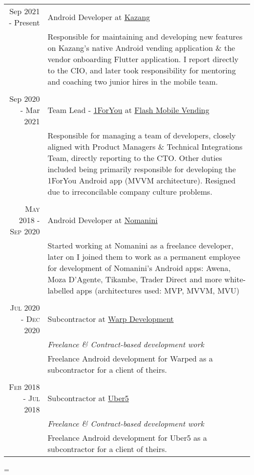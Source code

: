 \documentclass[a4paper,10pt,notitlepage]{article}
\newenvironment{absolutelynopagebreak}
  {\par\nobreak\vfil\penalty0\vfilneg
   \vtop\bgroup}
  {\par\xdef\tpd{\the\prevdepth}\egroup
   \prevdepth=\tpd}
\begin{document}
\begin{absolutelynopagebreak}
\begin{tabular}{r|p{11cm}}
	\textsc Sep 2021 - Present}  & Android Developer at \href{www.kazang.com}{Kazang}
		\\&\footnotesize{Responsible for maintaining and developing new features on Kazang's native Android vending application \& the vendor onboarding Flutter application. I report directly to the CIO, and later took responsibility for mentoring and coaching two junior hires in the mobile team.}\\
		
		\multicolumn{2}{c}{} \\
	
	\textsc Sep 2020 - Mar 2021}  & Team Lead - \href{www.1foryou.com}{1ForYou} at \href{www.flash.co.za}{Flash Mobile Vending}
		\\&\footnotesize{Responsible for managing a team of developers, closely aligned with Product Managers \& Technical Integrations Team, directly reporting to the CTO. Other duties included being primarily responsible for developing the 1ForYou Android app (MVVM architecture). Resigned due to irreconcilable company culture problems.}\\
		
		\multicolumn{2}{c}{} \\
	
	    \textsc{May 2018 - Sep 2020}  & Android Developer at \href{www.nomanini.com}{Nomanini}
		\\&\footnotesize{Started working at Nomanini as a freelance developer, later on I joined them to work as a permanent employee for development of Nomanini's Android apps: Awena, Moza D'Agente, Tikambe, Trader Direct and more white-labelled apps (architectures used: MVP, MVVM, MVU)}\\
		
		\multicolumn{2}{c}{} \\
		
		\textsc{Jul 2020 - Dec 2020}  & Subcontractor at \href{www.warpdevelopment.com}{Warp Development}
		\\&\emph{Freelance \& Contract-based development work}\\&\footnotesize{Freelance Android development for Warped as a subcontractor for a client of theirs.}\\
		
		\multicolumn{2}{c}{} \\
	
    	\textsc{Feb 2018 - Jul 2018}  & Subcontractor at \href{www.uber5.com}{Uber5}
		\\&\emph{Freelance \& Contract-based development work}\\&\footnotesize{Freelance Android development for Uber5 as a subcontractor for a client of theirs.}\\
		

\end{tabular}
\end{absolutelynopagebreak}
\end{document}
